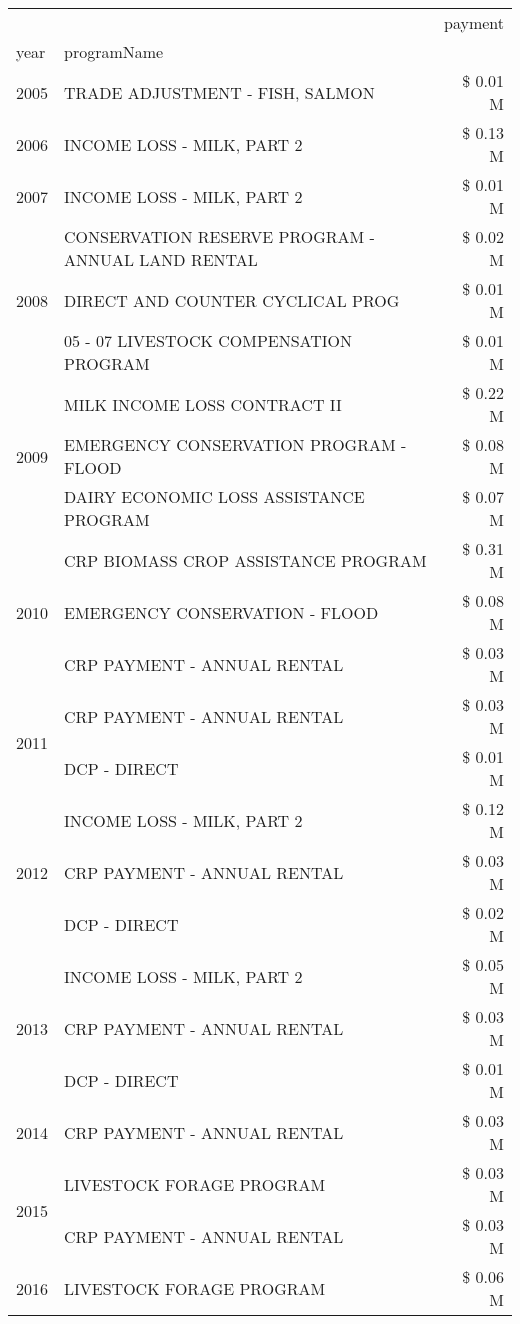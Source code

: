 \begin{tabular}{llr}
\toprule
 &  & payment \\
year & programName &  \\
\midrule
2005 & TRADE ADJUSTMENT - FISH, SALMON & \$ 0.01 M \\
\cline{1-3}
2006 & INCOME LOSS - MILK, PART 2 & \$ 0.13 M \\
\cline{1-3}
2007 & INCOME LOSS - MILK, PART 2 & \$ 0.01 M \\
\cline{1-3}
\multirow[t]{3}{*}{2008} & CONSERVATION RESERVE PROGRAM - ANNUAL LAND RENTAL & \$ 0.02 M \\
 & DIRECT AND COUNTER CYCLICAL PROG & \$ 0.01 M \\
 & 05 - 07 LIVESTOCK COMPENSATION PROGRAM & \$ 0.01 M \\
\cline{1-3}
\multirow[t]{3}{*}{2009} & MILK INCOME LOSS CONTRACT II & \$ 0.22 M \\
 & EMERGENCY CONSERVATION PROGRAM - FLOOD & \$ 0.08 M \\
 & DAIRY ECONOMIC LOSS ASSISTANCE PROGRAM & \$ 0.07 M \\
\cline{1-3}
\multirow[t]{3}{*}{2010} & CRP BIOMASS CROP ASSISTANCE PROGRAM & \$ 0.31 M \\
 & EMERGENCY CONSERVATION - FLOOD & \$ 0.08 M \\
 & CRP PAYMENT - ANNUAL RENTAL & \$ 0.03 M \\
\cline{1-3}
\multirow[t]{2}{*}{2011} & CRP PAYMENT - ANNUAL RENTAL & \$ 0.03 M \\
 & DCP - DIRECT & \$ 0.01 M \\
\cline{1-3}
\multirow[t]{3}{*}{2012} & INCOME LOSS - MILK, PART 2 & \$ 0.12 M \\
 & CRP PAYMENT - ANNUAL RENTAL & \$ 0.03 M \\
 & DCP - DIRECT & \$ 0.02 M \\
\cline{1-3}
\multirow[t]{3}{*}{2013} & INCOME LOSS - MILK, PART 2 & \$ 0.05 M \\
 & CRP PAYMENT - ANNUAL RENTAL & \$ 0.03 M \\
 & DCP - DIRECT & \$ 0.01 M \\
\cline{1-3}
2014 & CRP PAYMENT - ANNUAL RENTAL & \$ 0.03 M \\
\cline{1-3}
\multirow[t]{2}{*}{2015} & LIVESTOCK FORAGE PROGRAM & \$ 0.03 M \\
 & CRP PAYMENT - ANNUAL RENTAL & \$ 0.03 M \\
\cline{1-3}
\multirow[t]{3}{*}{2016} & LIVESTOCK FORAGE PROGRAM & \$ 0.06 M \\

\end{tabular}
